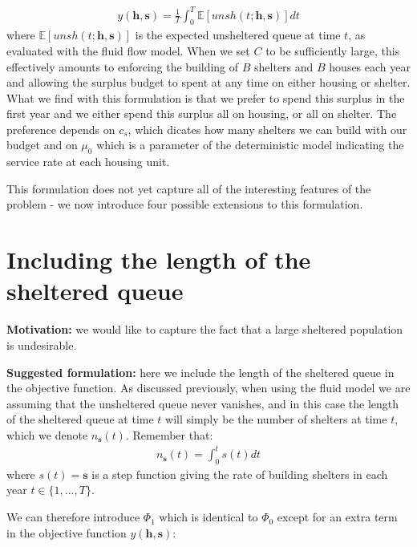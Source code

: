 \documentclass{article}
\begin{document}
\begin{align*}
  y(\boldsymbol{h},\boldsymbol{s}) = \frac{1}{T} \int_0^T \mathbb{E}[unsh(t; \boldsymbol{h},\boldsymbol{s})] dt
\end{align*}
where $\mathbb{E}[unsh(t;\boldsymbol{h},\boldsymbol{s})]$ is the expected unsheltered queue at time $t$, as evaluated with the fluid flow model. When we set $C$ to be sufficiently large, this effectively amounts to enforcing the building of $B$ shelters and $B$ houses each year and allowing the surplus budget to spent at any time on either housing or shelter. What we find with this formulation is that we prefer to spend this surplus in the first year and we either spend this surplus all on housing, or all on shelter. The preference depends on $c_s$, which dicates how many shelters we can build with our budget and on $\mu_0$ which is a parameter of the deterministic model indicating the service rate at each housing unit. \par
%
This formulation does not yet capture all of the interesting features of the problem - we now introduce four possible extensions to this formulation. \newpage

\section{Including the length of the sheltered queue}

\textbf{Motivation:} we would like to capture the fact that a large sheltered population is undesirable.

\textbf{Suggested formulation:} here we include the length of the sheltered queue in the objective function. As discussed previously, when using the fluid model we are assuming that the unsheltered queue never vanishes, and in this case the length of the sheltered queue at time $t$ will simply be the number of shelters at time $t$, which we denote $n_{\boldsymbol{s}}(t)$. Remember that:
\begin{align*}
  n_{\boldsymbol{s}}(t) = \int_0^t s(t) dt
\end{align*}
where $s(t)=\boldsymbol{s}$ is a step function giving the rate of building shelters in each year  $t \in \{1, ..., T\}$. \par
%
We can therefore introduce $\Phi_1$ which is identical to $\Phi_0$ except for an extra term in the objective function $y(\boldsymbol{h},\boldsymbol{s})$: 
\end{document}
